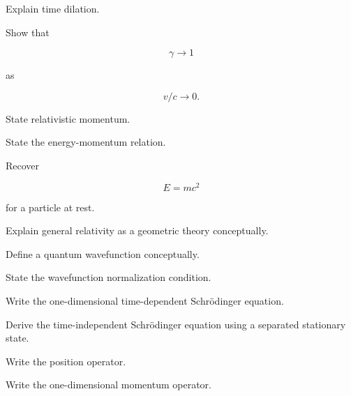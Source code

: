 \begin{exercise}[3]
Explain time dilation.
\end{exercise}

\begin{exercise}[3]
Show that

\[
\gamma\to1
\]

as

\[
v/c\to0.
\]
\end{exercise}

\begin{exercise}[2]
State relativistic momentum.
\end{exercise}

\begin{exercise}[2]
State the energy-momentum relation.
\end{exercise}

\begin{exercise}[3]
Recover

\[
E=mc^2
\]

for a particle at rest.
\end{exercise}

\begin{exercise}[3]
Explain general relativity as a geometric theory conceptually.
\end{exercise}

\begin{exercise}[2]
Define a quantum wavefunction conceptually.
\end{exercise}

\begin{exercise}[2]
State the wavefunction normalization condition.
\end{exercise}

\begin{exercise}[2]
Write the one-dimensional time-dependent Schrödinger equation.
\end{exercise}

\begin{exercise}[3]
Derive the time-independent Schrödinger equation using a separated
stationary state.
\end{exercise}

\begin{exercise}[2]
Write the position operator.
\end{exercise}

\begin{exercise}[2]
Write the one-dimensional momentum operator.
\end{exercise}

